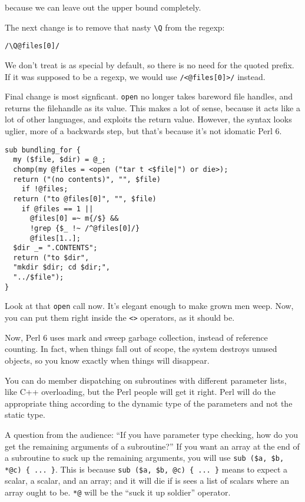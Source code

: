 \documentclass{article}
\newenvironment{example}
  {\addtolength{\linewidth}{-\parindent}%
   \null\begin{minipage}{\linewidth}}
  {\end{minipage}\addtolength{\linewidth}{\parindent}\null}
\begin{document}
\noindent because we can leave out the upper bound completely.

The next change is to remove that nasty \verb'\Q' from the 
regexp:

\verb'/\Q@files[0]/'

\noindent We don't treat is as special by default, so there is no need
for the quoted prefix.  If it was supposed to be a regexp, we would use
\verb'/<@files[0]>/' instead.

Final change is most signficant.  \verb'open' no longer takes bareword file
handles, and returns the filehandle as its value.  This makes a lot of
sense, because it acts like a lot of other languages, and exploits the
return value.  However, the syntax looks uglier, more of a
backwards step, but that's because it's not idomatic Perl 6.

\begin{example}
\begin{verbatim}
sub bundling_for {
  my ($file, $dir) = @_;
  chomp(my @files = <open ("tar t <$file|") or die>);
  return ("(no contents)", "", $file)
    if !@files;
  return ("to @files[0]", "", $file)
    if @files == 1 ||
      @files[0] =~ m{/$} &&
	  !grep {$_ !~ /^@files[0]/}
	  @files[1..];
  $dir _= ".CONTENTS";
  return ("to $dir",
  "mkdir $dir; cd $dir;",
  "../$file");
}

\end{verbatim}
\end{example}
Look at that \verb'open' call now.  It's elegant enough to make grown
men weep.  Now, you can put them right inside the \verb'<>' operators,
as it should be.

Now, Perl 6 uses mark and sweep garbage collection, instead of reference
counting.  In fact, when things fall out of scope, the system destroys
unused objects, so you know exactly when things will disappear.

You can do member dispatching on subroutines with different
parameter lists, like C++ overloading, but the Perl people will get it
right. Perl will do the appropriate thing according to the dynamic
type of the parameters and not the static type.

A question from the audience: ``If you have parameter type checking, how
do you get the remaining arguments of a subroutine?''  If you want an 
array at the end of a subroutine to suck up the remaining
arguments, you will use \verb'sub ($a, $b, *@c) { ... }'.  This is
because \verb'sub ($a, $b, @c) { ... }' means to expect a scalar, a
scalar, and an array; and it will die if is sees a list of scalars
where an array ought to be.  \verb'*@' will be the ``suck
it up soldier'' operator.  
\end{document}
